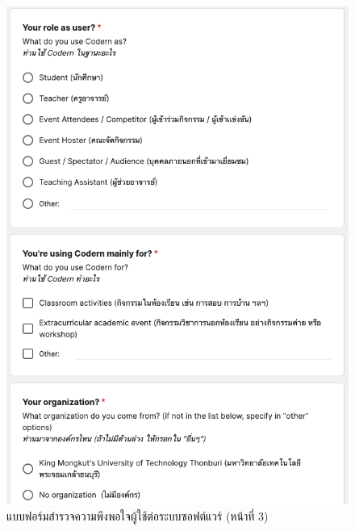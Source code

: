 \documentclass[12pt,one side,openright,a4paper]{cpe-thesis-th}
\begin{document}
\begin{figure}[H]
  \centering
  \includegraphics[width=15cm]{figure/results/forms/survey-google-p2-2.png}
  \caption[แบบฟอร์มสำรวจความพึงพอใจผู้ใช้ต่อระบบซอฟต์แวร์ (หน้าที่ 3)]{แบบฟอร์มสำรวจความพึงพอใจผู้ใช้ต่อระบบซอฟต์แวร์ (หน้าที่ 3)}
\end{figure}
\end{document}
